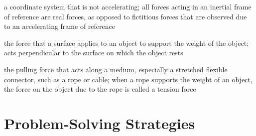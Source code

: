 \documentclass[
]{book}
\providecommand{\tightlist}{%
  \setlength{\itemsep}{0pt}\setlength{\parskip}{0pt}}
\begin{document}
\begin{description}
\tightlist
\item[inertial frame of reference]
a coordinate system that is not accelerating; all forces acting in
an inertial frame of reference are real forces, as opposed to
fictitious forces that are observed due to an accelerating frame of
reference
\end{description}

\begin{description}
\tightlist
\item[normal force]
the force that a surface applies to an object to support the weight
of the object; acts perpendicular to the surface on which the object
rests
\end{description}

\begin{description}
\tightlist
\item[tension]
the pulling force that acts along a medium, especially a stretched
flexible connector, such as a rope or cable; when a rope supports
the weight of an object, the force on the object due to the rope is
called a tension force
\end{description}

\hypertarget{problem-solving-strategies}{%
\section{Problem-Solving Strategies}\label{problem-solving-strategies}}
\end{document}
